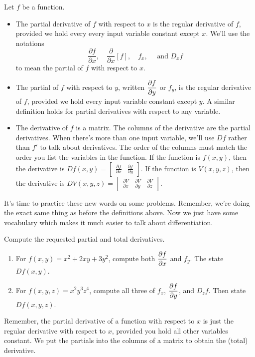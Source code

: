 \begin{dfn}
 Let $f$ be a function. 
\begin{itemize}
 \item The partial derivative of $f$ with respect to $x$ is the regular derivative of $f$, provided we hold every every input variable constant except $x$.  We'll use the notations
 $$
 \frac{\partial f}{\partial x}, 
 \quad \frac{\partial}{\partial x}[f],
 \quad f_x,
 \quad \text{ and }D_x f 
 $$
to mean the partial of $f$ with respect to $x$.
 \item The partial of $f$ with respect to $y$, written $\displaystyle \frac{\partial f}{\partial y}$ or $f_y$, is the regular derivative of $f$, provided we hold every input variable constant except $y$. A similar definition holds for partial derivatives with respect to any variable.
 \item The derivative of $f$ is a matrix. The columns of the derivative are the partial derivatives. When there's more than one input variable, we'll use $Df$ rather than $f'$ to talk about derivatives.  The order of the columns must match the order you list the variables in the function. If the function is $f(x,y)$, then the derivative is 
 $Df(x,y) = \begin{bmatrix}\frac{\partial f}{\partial x}&\frac{\partial f}{\partial y}\end{bmatrix}.$
 If the function is $V(x,y,z)$, then the derivative is 
 $DV(x,y,z) = \begin{bmatrix}\frac{\partial V}{\partial x}&\frac{\partial V}{\partial y}&\frac{\partial V}{\partial z}\end{bmatrix}.$
 
\end{itemize}
\end{dfn}

It's time to practice these new words on some problems.  Remember, we're doing the exact same thing as before the definitions above. Now we just have some vocabulary which makes it much easier to talk about differentiation.

\begin{problem}%
Compute the requested partial and total derivatives.
\begin{enumerate}
 \item  For $f(x,y)=x^2+2xy+3y^2$, compute both $\displaystyle\frac{\partial f}{\partial x}$ and $f_y$. The state $Df(x,y)$. 
 \item  For $f(x,y,z)=x^2y^3z^4$, compute all three of $f_x$, $\displaystyle\frac{\partial f}{\partial y}$, and $D_z f$. Then state $Df(x,y,z)$.
\end{enumerate}
Remember, the partial derivative of a function with respect to $x$ is just the regular derivative with respect to $x$, provided you hold all other variables constant. We put the partials into the columns of a matrix to obtain the (total) derivative.
\end{problem}

